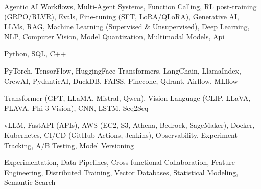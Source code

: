 \documentclass[letter,10pt]{article}
\begin{document}
 Agentic AI Workflows, Multi-Agent Systems, Function Calling, RL post-training (GRPO/RLVR), Evals, Fine-tuning (SFT, LoRA/QLoRA), Generative AI, LLMs, RAG, Machine Learning (Supervised \& Unsupervised), Deep Learning, NLP, Computer Vision, Model Quantization, Multimodal Models, Api\par\vspace{2pt}

 Python, SQL, C++\par\vspace{2pt}

 PyTorch, TensorFlow, HuggingFace Transformers, LangChain, LlamaIndex, CrewAI, PydanticAI, DuckDB, FAISS, Pinecone, Qdrant, Airflow, MLflow\par\vspace{2pt}

 Transformer (GPT, LLaMA, Mistral, Qwen), Vision-Language (CLIP, LLaVA, FLAVA, Phi-3 Vision), CNN, LSTM, Seq2Seq\par\vspace{2pt}

 vLLM, FastAPI (APIs), AWS (EC2, S3, Athena, Bedrock, SageMaker), Docker, Kubernetes, CI/CD (GitHub Actions, Jenkins), Observability, Experiment Tracking, A/B Testing, Model Versioning\par\vspace{2pt}

 Experimentation, Data Pipelines, Cross-functional Collaboration, Feature Engineering, Distributed Training, Vector Databases, Statistical Modeling, Semantic Search
\end{document}
